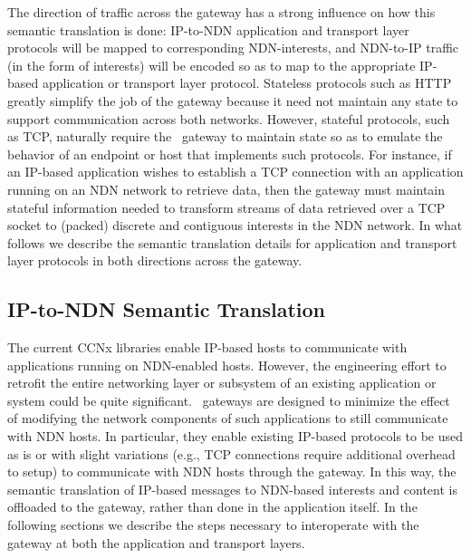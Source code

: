 The direction of traffic across the gateway has a strong influence on how this semantic translation is done: IP-to-NDN application and transport layer protocols will be mapped to corresponding NDN-interests, and NDN-to-IP traffic (in the form of interests) will be encoded so as to map to the appropriate IP-based application or transport layer protocol. Stateless protocols such as HTTP greatly simplify the job of the gateway because it need not maintain any state to support communication across both networks. However, stateful protocols, such as TCP, naturally require the \sink\ gateway to maintain state so as to emulate the behavior of an endpoint or host that implements such protocols. For instance, if an IP-based application wishes to establish a TCP connection with an application running on an NDN network to retrieve data, then the gateway must maintain stateful information needed to transform streams of data retrieved over a TCP socket to (packed) discrete and contiguous interests in the NDN network. In what follows we describe the semantic translation details for application and transport layer protocols in both directions across the gateway. 

\subsection{IP-to-NDN Semantic Translation}
The current CCNx libraries enable IP-based hosts to communicate with applications running on NDN-enabled hosts. However, the engineering effort to retrofit the entire networking layer or subsystem of an existing application or system could be quite significant. \sink\ gateways are designed to minimize the effect of modifying the network components of such applications to still communicate with NDN hosts. In particular, they enable existing IP-based protocols to be used as is or with slight variations (e.g., TCP connections require additional overhead to setup) to communicate with NDN hosts through the gateway. In this way, the semantic translation of IP-based messages to NDN-based interests and content is offloaded to the gateway, rather than done in the application itself. In the following sections we describe the steps necessary to interoperate with the gateway at both the application and transport layers.



